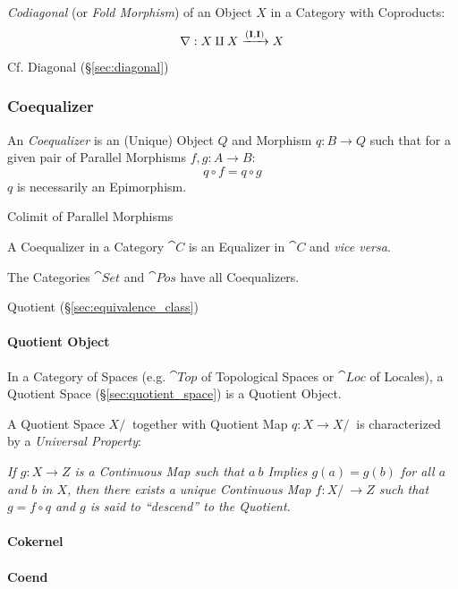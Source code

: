 \emph{Codiagonal} (or \emph{Fold Morphism}) of an Object $X$ in a
Category with Coproducts:
\[
  \nabla : X \amalg X \xrightarrow{(\mathbf{I},\mathbf{I})} X
\]

\fist Cf. Diagonal (\S\ref{sec:diagonal})



\subsubsection{Coequalizer}\label{sec:coequalizer}

An \emph{Coequalizer} is an (Unique) Object $Q$ and Morphism $q: B
\rightarrow Q$ such that for a given pair of Parallel Morphisms $f,g :
A \rightarrow B$:
\[
  q \circ f = q \circ g
\]
$q$ is necessarily an Epimorphism.

Colimit of Parallel Morphisms

A Coequalizer in a Category $\cat{C}$ is an Equalizer in
$\cat{C}$ and \emph{vice versa}.

The Categories $\cat{Set}$ and $\cat{Pos}$ have all
Coequalizers.

Quotient (\S\ref{sec:equivalence_class})



\paragraph{Quotient Object}\label{sec:quotient_object}\hfill

In a Category of Spaces (e.g. $\cat{Top}$ of Topological Spaces or $\cat{Loc}$
of Locales), a Quotient Space (\S\ref{sec:quotient_space}) is a Quotient
Object.

A Quotient Space $X/~$ together with Quotient Map $q : X \rightarrow X/~$ is
characterized by a \emph{Universal Property}:

\emph{If $g : X \rightarrow Z$ is a Continuous Map such that $a ~ b$ Implies $g(a)
  = g(b)$ for all $a$ and $b$ in $X$, then there exists a unique Continuous Map
  $f : X/~ \rightarrow Z$ such that $g = f \circ q$ and $g$ is said to
  ``descend'' to the Quotient.}



\paragraph{Cokernel}\label{sec:cokernel}\hfill

\paragraph{Coend}\label{sec:coend}\hfill

